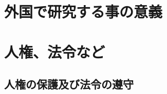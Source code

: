 \documentclass[11pt,a4paper,uplatex,twoside,dvipdfmx]{ujarticle} 	%
\newcommand{\研究課題名}{\mgfamily ストカスティック形式、原始ブラックホール、重力波観測から迫るインフレーション}
\newcommand{\研究機関名}{\mgfamily 名古屋大学}
\newcommand{\申請者氏名}{\mgfamily 多田 祐一郎}
\newcommand{\研究代表者氏名}{\申請者氏名}
\newcommand{\研究期間の最終元号年度}{34}	%
\begin{document}
\section{外国で研究する事の意義}
\newcommand{\外国で研究する事の意義}{%
	
	\begin{mdframed}[roundcorner=0.5zw,
	innertopmargin=0.8zw,innerbottommargin=0.8zw,
	linecolor=black!50,linewidth=0.2zw,
	backgroundcolor=black!10]
	{\bfseries\gtfamily\sffamily\large ① 研究関連性}
	\end{mdframed}
	
	\begin{mdframed}[roundcorner=0.5zw,
	innertopmargin=0.8zw,innerbottommargin=0.8zw,
	linecolor=black!50,linewidth=0.2zw,
	backgroundcolor=black!10]
	{\bfseries\gtfamily\sffamily\large ② 派遣の意義}
	\end{mdframed}

	
}

\section{人権、法令など}
\subsection{人権の保護及び法令の遵守}
\newcommand{\人権の保護及び法令等の遵守への対応}{%
	本研究は該当しない.
}
\end{document}
